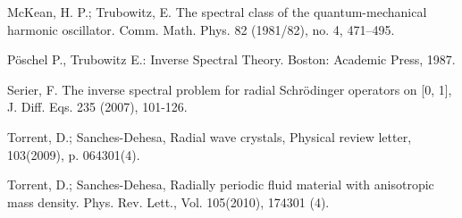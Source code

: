 \documentclass[10pt]{amsart}
\begin{document}
\begin{thebibliography}
 McKean, H. P.; Trubowitz, E. The spectral class of the quantum-mechanical harmonic oscillator.
Comm. Math. Phys. 82 (1981/82), no. 4, 471--495.

 P\"oschel P., Trubowitz E.: Inverse Spectral Theory.
Boston: Academic Press, 1987.

 Serier, F. The inverse spectral problem for radial Schr\"odinger operators on [0, 1], J. Diff.
Eqs. 235 (2007), 101-126.

 Torrent, D.; Sanches-Dehesa, Radial wave crystals, Physical review letter, 103(2009), p. 064301(4).

  Torrent, D.; Sanches-Dehesa, Radially periodic fluid material with anisotropic mass density. Phys. Rev. Lett., Vol. 105(2010), 174301 (4).
\end{thebibliography}
\end{document}
